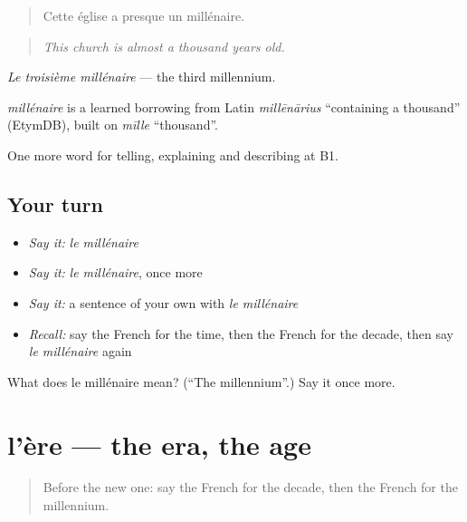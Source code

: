 \begin{quote}
Cette église a presque un millénaire.
\end{quote}

\begin{quote}
\emph{This church is almost a thousand years old.}
\end{quote}

\emph{Le troisième millénaire} — the third millennium.

\begin{cousinweb}
\emph{millénaire} is a learned borrowing from Latin \emph{millēnārius} \textquotedblleft{}containing a thousand\textquotedblright{} (EtymDB), built on \emph{mīlle} \textquotedblleft{}thousand\textquotedblright{}.
\end{cousinweb}

\begin{grammarlens}[title={What you've built}]
One more word for telling, explaining and describing at B1.
\end{grammarlens}

\subsection*{Your turn}
\begin{itemize}
\raggedright
  \item \emph{Say it:} \emph{le millénaire}
  \item \emph{Say it:} \emph{le millénaire}, once more
  \item \emph{Say it:} a sentence of your own with \emph{le millénaire}
  \item \emph{Recall:} say the French for the time, then the French for the decade, then say \emph{le millénaire} again
\end{itemize}

\begin{tcolorbox}[breakable,colback=teal!4,colframe=teal!35!black,title={Before you move on}]
What does le millénaire mean? (\textquotedblleft{}The millennium\textquotedblright{}.) Say it once more.
\end{tcolorbox}
\section[l'ère]{l'ère — the era, the age}

\label{lesson:FR-C276-ere}



\begin{quote}
Before the new one: say the French for the decade, then the French for the millennium.
\end{quote}

